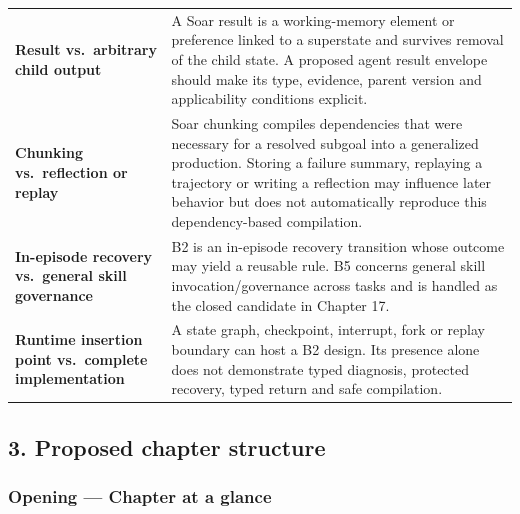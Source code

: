 \begin{longtable}[]{@{}
  >{\raggedright\arraybackslash}p{}
  >{\raggedright\arraybackslash}p{}@{}}
\textbf{Result vs.~arbitrary child output} & A Soar result is a working-memory element or preference linked to a superstate and survives removal of the child state. A proposed agent result envelope should make its type, evidence, parent version and applicability conditions explicit. \\
\textbf{Chunking vs.~reflection or replay} & Soar chunking compiles dependencies that were necessary for a resolved subgoal into a generalized production. Storing a failure summary, replaying a trajectory or writing a reflection may influence later behavior but does not automatically reproduce this dependency-based compilation. \\
\textbf{In-episode recovery vs.~general skill governance} & B2 is an in-episode recovery transition whose outcome may yield a reusable rule. B5 concerns general skill invocation/governance across tasks and is handled as the closed candidate in Chapter 17. \\
\textbf{Runtime insertion point vs.~complete implementation} & A state graph, checkpoint, interrupt, fork or replay boundary can host a B2 design. Its presence alone does not demonstrate typed diagnosis, protected recovery, typed return and safe compilation. \\
\end{longtable}

\subsection{3. Proposed chapter structure}\label{proposed-chapter-structure}

\subsubsection{Opening --- Chapter at a glance}\label{opening-chapter-at-a-glance}

